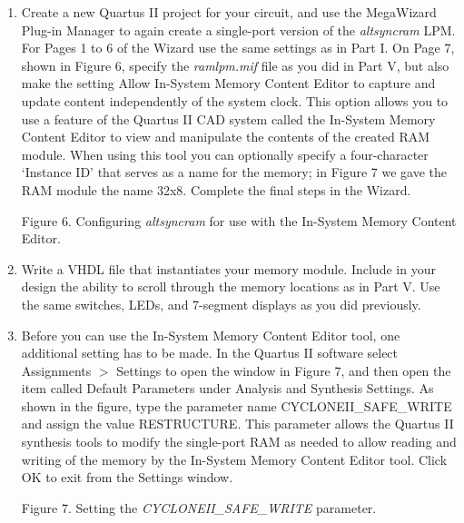 \documentclass[psfig,10pt,fullpage]{article}
\begin{document}
\begin{enumerate}
\item Create a new Quartus II project for your circuit, and use the
MegaWizard Plug-in Manager to again create a single-port version of the {\it altsyncram}
LPM. For Pages 1 to 6 of the Wizard use the same settings as in Part I. On Page 7, shown
in Figure 6, specify the {\it ramlpm.mif} file as you did in Part V, but also make the
setting {\sf Allow In-System Memory Content Editor to capture and 
update content independently of the
system clock}. This option allows you to use a feature of the Quartus II CAD system called the 
In-System Memory Content Editor to view and manipulate the contents of the created RAM
module. When using this tool you can optionally specify a four-character {\sf `Instance
ID'} that serves as a name for the memory; in Figure 7 we gave the RAM module the
name {\sf 32x8}. Complete the final steps in the Wizard.

\begin{figure}[H]
\scriptsize
\centerline{
\hbox{}}
\end{figure}
\centerline{Figure 6.  Configuring {\it altsyncram} for use with the In-System Memory Content Editor.}

\item Write a VHDL file that instantiates your memory module. Include in your design
the ability to scroll through the memory locations as in Part V. Use the same switches,
LEDs, and 7-segment displays as you did previously.

\item Before you can use the In-System Memory Content Editor tool, one additional setting
has to be made. In the 
Quartus II software select {\sf Assignments $>$ Settings} to open the window in Figure
7, and then open the item called
{\sf Default Parameters} under {\sf Analysis and Synthesis
Settings}. As shown in the figure, type the parameter name {\sf CYCLONEII\_SAFE\_WRITE} and
assign the value {\sf RESTRUCTURE}. This parameter allows the Quartus II synthesis tools
to modify the single-port RAM as needed to allow reading and writing of the memory by the 
In-System Memory Content Editor tool. Click {\sf OK} to exit from the Settings window.

\begin{figure}[H]
\scriptsize
\centerline{
\hbox{}}
\end{figure}
\centerline{Figure 7.  Setting the {\it CYCLONEII\_SAFE\_WRITE} parameter.}


\end{enumerate}
\end{document}
